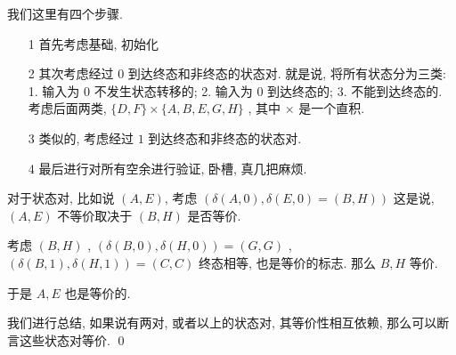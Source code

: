 \documentclass[../main.tex]{subfiles}
\begin{document}
我们这里有四个步骤. 

\begin{itemize}
\item [1] 首先考虑基础, 初始化 
\item [2] 其次考虑经过 \(0\) 到达终态和非终态的状态对. 
	就是说, 将所有状态分为三类: 1. 输入为 \(0\) 不发生状态转移的; 2. 输入为 \(0\) 到达终态的; 3. 不能到达终态的. 
	考虑后面两类,  \(\{ D , F \} \times \{ A, B , E , G , H \}\) , 其中 \(\times\) 是一个直积. 
\item [3] 类似的, 考虑经过 \(1\) 到达终态和非终态的状态对. 
\item [4] 最后进行对所有空余进行验证, 卧槽, 真几把麻烦.
\end{itemize}

\begin{remark}
	对于状态对, 比如说 \((A , E)\), 考虑 \((\delta (A , 0) ,\delta (E, 0 ) = ( B , H) )\) 这是说, \( (A, E ) \) 不等价取决于 \((B, H) \) 是否等价. 

	考虑 \(( B,  H ) \) , \((\delta (B , 0 ) ,\delta (H , 0 ) ) = (G , G) \) , \( (\delta (B , 1 )  ,\delta (H , 1 ) ) = (C, C)\)
	终态相等, 也是等价的标志. 那么 \(B, H\) 等价. 

	于是 \(A, E\) 也是等价的. 

	我们进行总结, 如果说有两对, 或者以上的状态对, 其等价性相互依赖, 那么可以断言这些状态对等价.  \qed
\end{remark}
\end{document}
